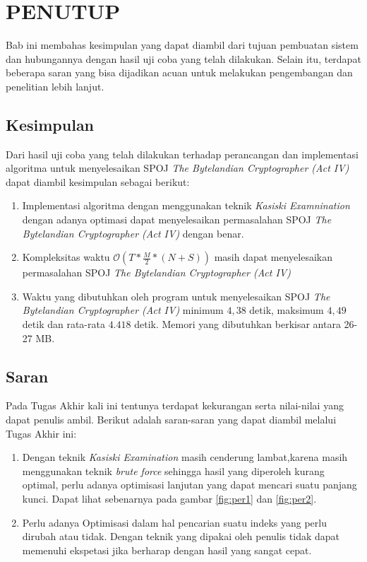 \chapter{PENUTUP}
  Bab ini membahas kesimpulan yang dapat diambil dari tujuan pembuatan sistem dan hubungannya dengan hasil uji coba yang telah dilakukan. Selain itu, terdapat beberapa saran yang bisa dijadikan acuan untuk melakukan pengembangan dan penelitian lebih lanjut.
  \section{Kesimpulan}
 Dari hasil uji coba yang telah dilakukan terhadap perancangan dan implementasi algoritma untuk menyelesaikan SPOJ \textit{The Bytelandian Cryptographer (Act IV)} dapat diambil kesimpulan sebagai berikut:
 
 \begin{enumerate}
 \item Implementasi algoritma dengan menggunakan teknik \textit{Kasiski Examnination} dengan adanya optimasi dapat menyelesaikan permasalahan SPOJ \textit{The Bytelandian Cryptographer (Act IV)} dengan benar.
 \item Kompleksitas waktu $\mathcal{O}(T*\frac{M}{2}*(N+S))$ masih dapat menyelesaikan permasalahan SPOJ \textit{The Bytelandian Cryptographer (Act IV)}
 \item Waktu yang dibutuhkan oleh program untuk menyelesaikan SPOJ \textit{The Bytelandian Cryptographer (Act IV)} minimum $4,38$ detik, maksimum $4,49$ detik dan rata-rata $4.418$ detik. Memori yang dibutuhkan berkisar antara 26-27 MB. %
 \end{enumerate}
  
  \section{Saran}
  Pada Tugas Akhir kali ini tentunya terdapat kekurangan serta nilai-nilai yang dapat penulis ambil. Berikut adalah saran-saran yang dapat diambil melalui Tugas Akhir ini:
  \begin{enumerate}
    \item Dengan teknik \textit{Kasiski Examination} masih cenderung lambat,karena masih menggunakan teknik \textit{brute force} sehingga hasil yang diperoleh kurang optimal, perlu adanya optimisasi lanjutan yang dapat mencari suatu panjang kunci. Dapat lihat sebenarnya pada gambar \ref{fig:per1} dan \ref{fig:per2}.%
    \item Perlu adanya Optimisasi dalam hal pencarian suatu indeks yang perlu dirubah atau tidak. Dengan teknik yang dipakai oleh penulis tidak dapat memenuhi ekspetasi jika berharap dengan hasil yang sangat cepat.
    
  \end{enumerate}
  
